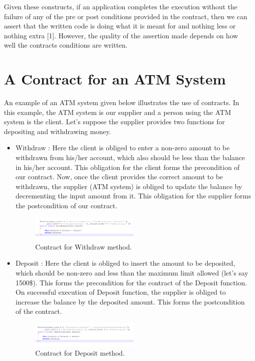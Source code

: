 Given these constructs, if an application completes the execution without the failure of any of the pre or post conditions provided in the contract, then we can assert that the written code is doing what it is meant for and nothing less or nothing extra [1].
However, the quality of the assertion made depends on how well the contracts conditions are written. 

\section{A Contract for an ATM System}

An example of an ATM system given below illustrates the use of contracts.
In this example, the ATM system is our supplier and a person using the ATM system is the client. Let's suppose the supplier provides two functions for depositing and withdrawing money.
\begin{itemize}
\item Withdraw :
Here the client is obliged to enter a non-zero amount to be withdrawn from his/her account, which also should be less than the balance in his/her account. This obligation for the client forms the precondition of our contract.
Now, once the client provides the correct amount to be withdrawn, the supplier (ATM system) is obliged to update the balance by decrementing the input amount from it. This obligation for the supplier forms the postcondition of our contract.
\linebreak
\begin{figure}[htb]
\centering
\includegraphics[width=0.5\textwidth]{images/WithdrawContractExample.PNG}
\caption{Contract for Withdraw method.} 
\label{fig:WithdrawContract}
\end{figure}

\newpage

\item Deposit :
Here the client is obliged to insert the amount to be deposited, which should be non-zero and less than the maximum limit allowed (let's say 1500\$). This forms the precondition for the contract of the Deposit function.
On successful execution of Deposit function, the supplier is obliged to increase the balance by the deposited amount. This forms the postcondition of the contract.
\linebreak
\begin{figure}[htb]
\centering
\includegraphics[width=0.5\textwidth]{images/DepositContract.PNG}
\caption{Contract for Deposit method.} 
\label{fig:DepositContract}
\end{figure}  
      
\end{itemize}


